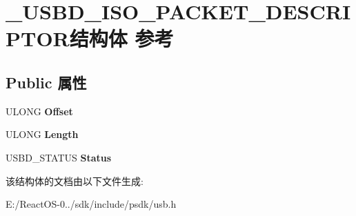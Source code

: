 \hypertarget{struct___u_s_b_d___i_s_o___p_a_c_k_e_t___d_e_s_c_r_i_p_t_o_r}{}\section{\+\_\+\+U\+S\+B\+D\+\_\+\+I\+S\+O\+\_\+\+P\+A\+C\+K\+E\+T\+\_\+\+D\+E\+S\+C\+R\+I\+P\+T\+O\+R结构体 参考}
\label{struct___u_s_b_d___i_s_o___p_a_c_k_e_t___d_e_s_c_r_i_p_t_o_r}
\subsection*{Public 属性}
\begin{DoxyCompactItemize}
\item 
\mbox{\label{struct___u_s_b_d___i_s_o___p_a_c_k_e_t___d_e_s_c_r_i_p_t_o_r_add22e3d67a69a9f766b755785f47e2c0}} 
U\+L\+O\+NG {\bfseries Offset}
\item 
\mbox{\label{struct___u_s_b_d___i_s_o___p_a_c_k_e_t___d_e_s_c_r_i_p_t_o_r_a039cb15e9a692349793657327cfb1c0f}} 
U\+L\+O\+NG {\bfseries Length}
\item 
\mbox{\label{struct___u_s_b_d___i_s_o___p_a_c_k_e_t___d_e_s_c_r_i_p_t_o_r_afd92d7c3eebb90b0e6b9a93d6b2cecfe}} 
U\+S\+B\+D\+\_\+\+S\+T\+A\+T\+US {\bfseries Status}
\end{DoxyCompactItemize}


该结构体的文档由以下文件生成\+:\begin{DoxyCompactItemize}
\item 
E\+:/\+React\+O\+S-\/0../sdk/include/psdk/usb.\+h\end{DoxyCompactItemize}
